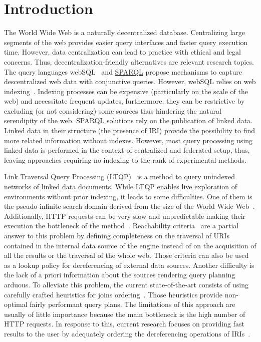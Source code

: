 \section{Introduction}

The World Wide Web is a naturally decentralized database.
Centralizing large segments of the web provides easier query interfaces and faster query execution time.
However, data centralization can lead to practice with ethical and legal concerns.
Thus, decentralization-friendly alternatives are relevant research topics.
The query languages webSQL~\cite{Mendelzon1996} and \href{https://www.w3.org/TR/sparql11-query/}{SPARQL} propose mechanisms to capture descentralized web data with conjunctive queries.
However, webSQL relies on web indexing~\cite{Mendelzon1996}.
Indexing processes can be expensive (particularly on the scale of the web) and necessitate frequent updates, furthermore, they can be restrictive by excluding (or not considering) some sources thus hindering the natural serendipity of the web.
SPARQL solutions rely on the publication of linked data.
Linked data in their structure (the presence of IRI) provide the possibility to find more related information without indexes.
However, most query processing using linked data is performed in the context of centralized and federated setup, thus, leaving approaches requiring no indexing to the rank of experimental methods. 

Link Traversal Query Processing (LTQP)~\cite{Hartig2012} is a method to query unindexed networks of linked data documents.
While LTQP enables live exploration of environments without prior indexing, it leads to some difficulties.
One of them is the pseudo-infinite search domain derived from the size of the World Wide Web~\cite{hartig2016walking}.
Additionally, HTTP requests can be very slow and unpredictable making their execution the bottleneck of the method~\cite{hartig2016walking}.
Reachability criteria~\cite{Hartig2012} are a partial answer to this problem by defining completeness on the traversal of URIs
contained in the internal data source of the engine instead of on the acquisition of all the results or the traversal of the whole web.
Those criteria can also be used as a lookup policy for dereferencing of external data sources.
Another difficulty is the lack of a priori information about the sources rendering query planning arduous.
To alleviate this problem, the current state-of-the-art consists of using carefully crafted heuristics for joins ordering~\cite{Hartig2011}.
Those heuristics provide non-optimal fairly performant query plans.
The limitations of this approach are usually of little importance because the main bottleneck is the high number of HTTP requests.
In response to this, current research focuses on providing fast results to the user by adequately ordering the dereferencing operations of IRIs~\cite{hartig2016walking}.

